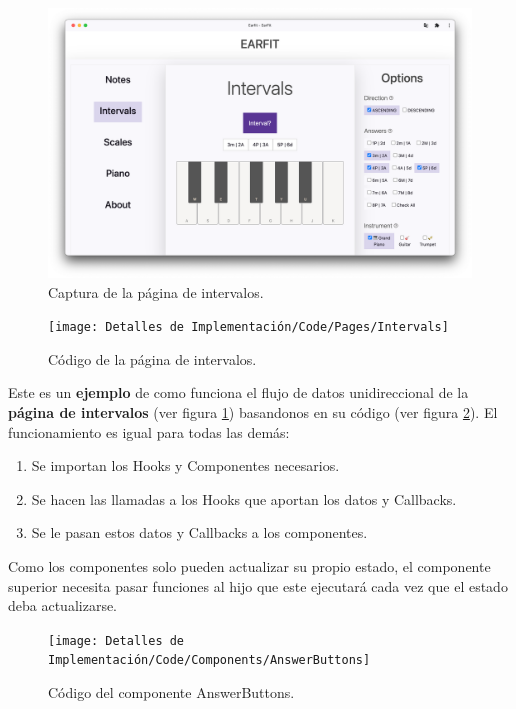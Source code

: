 \documentclass[12pt,twoside,titlepage]{report}
\begin{document}
\begin{figure}[H]
    \centering
    \includegraphics[scale=0.28]{Capturas Earfit/PC/Intervals}
    \caption{Captura de la página de intervalos.}
    \label{fig:PCIntervals1}
\end{figure}

\begin{figure}[H]
    \centering
    \texttt{[image: Detalles de Implementación/Code/Pages/Intervals]}
    \caption{Código de la página de intervalos.}
    \label{fig:IntervalsPage}
\end{figure}

Este es un \textbf{ejemplo} de como funciona el flujo de datos unidireccional de la \textbf{página de intervalos} (ver figura \ref{fig:PCIntervals1}) basandonos en su código (ver figura \ref{fig:IntervalsPage}). El funcionamiento es igual para todas las demás: 

\begin{enumerate}
    \item  Se importan los Hooks y Componentes necesarios.
    \item  Se hacen las llamadas a los Hooks que aportan los datos y Callbacks.
    \item  Se le pasan estos datos y Callbacks a los componentes.
\end{enumerate}

Como los componentes solo pueden actualizar su propio estado, el componente superior necesita pasar funciones al hijo que este ejecutará cada vez que el estado deba actualizarse.

\begin{figure}[H]
    \centering
    \texttt{[image: Detalles de Implementación/Code/Components/AnswerButtons]}
    \caption{Código del componente AnswerButtons.}
    \label{fig:AnswerButtons}
\end{figure}
\end{document}
